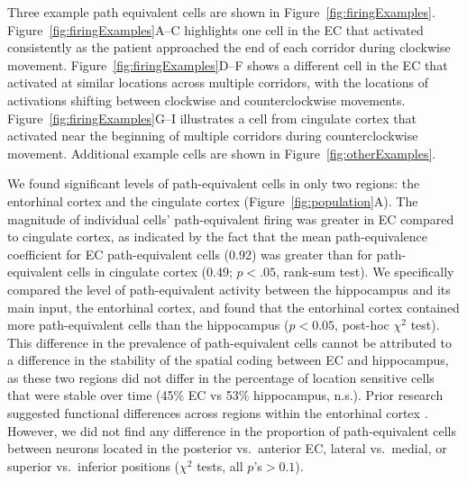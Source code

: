 Three example path equivalent cells are shown in Figure~\ref{fig:firingExamples}. Figure~\ref{fig:firingExamples}A--C highlights one cell in the EC that activated consistently as the patient approached the end of each corridor during clockwise movement. Figure~\ref{fig:firingExamples}D--F shows a different cell in the EC that activated at similar locations across multiple corridors, with the locations of activations shifting between clockwise and counterclockwise movements. Figure~\ref{fig:firingExamples}G--I illustrates a cell from cingulate cortex that activated near the beginning of multiple corridors during counterclockwise movement. Additional example cells are shown in Figure~\ref{fig:otherExamples}.

We found significant levels of path-equivalent cells in only two regions: the entorhinal cortex and the cingulate cortex (Figure~\ref{fig:population}A).  The magnitude of individual cells' path-equivalent firing was greater in EC compared to cingulate cortex, as indicated by the fact that the mean path-equivalence coefficient for EC path-equivalent cells (0.92) was greater than for path-equivalent cells in cingulate cortex (0.49; $p<.05$, rank-sum test). We specifically compared the level of path-equivalent activity between the hippocampus and its main input, the entorhinal cortex, and found that the entorhinal cortex contained more path-equivalent cells than the hippocampus ($p<0.05$, post-hoc $\chi^2$ test). This difference in the prevalence of path-equivalent cells cannot be attributed to a difference in the stability of the spatial coding between EC and hippocampus, as these two regions did not differ in the percentage of location sensitive cells that were stable over time (45\% EC vs 53\% hippocampus, n.s.).  Prior research suggested functional differences across regions within the entorhinal cortex \cite{HaftEtal05,HargEtal05,BrunEtal08a}.  However, we did not find any difference in the proportion of path-equivalent cells between neurons located in the posterior vs.\ anterior EC, lateral vs.\ medial, or superior vs.\ inferior positions ($\chi^2$ tests, all $p$'s$ > 0.1$).

